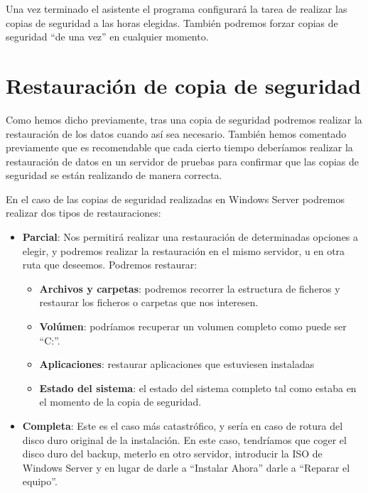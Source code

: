 Una vez terminado el asistente el programa configurará la tarea de realizar las copias de seguridad a las horas elegidas. También podremos forzar copias de seguridad “de una vez” en cualquier momento.

\section{Restauración de copia de seguridad}
Como hemos dicho previamente, tras una copia de seguridad podremos realizar la restauración de los datos cuando así sea necesario. También hemos comentado previamente que es recomendable que cada cierto tiempo deberíamos realizar la restauración de datos en un servidor de pruebas para confirmar que las copias de seguridad se están realizando de manera correcta.

En el caso de las copias de seguridad realizadas en Windows Server podremos realizar dos tipos de restauraciones:

\begin{itemize}
    \item \textbf{Parcial}: Nos permitirá realizar una restauración de determinadas opciones a elegir, y podremos realizar la restauración en el mismo servidor, u en otra ruta que deseemos. Podremos restaurar:
    \begin{itemize}
        \item \textbf{Archivos y carpetas}: podremos recorrer la estructura de ficheros y restaurar los ficheros o carpetas que nos interesen.
        \item \textbf{Volúmen}: podríamos recuperar un volumen completo como puede ser “C:”.
        \item \textbf{Aplicaciones}: restaurar aplicaciones que estuviesen instaladas
        \item \textbf{Estado del sistema}: el estado del sistema completo tal como estaba en el momento de la copia de seguridad.
    \end{itemize}

    \item \textbf{Completa}: Este es el caso más catastrófico, y sería en caso de rotura del disco duro original de la instalación. En este caso, tendríamos que coger el disco duro del backup, meterlo en otro servidor, introducir la ISO de Windows Server y en lugar de darle a “Instalar Ahora” darle a “Reparar el equipo”.
\end{itemize}


